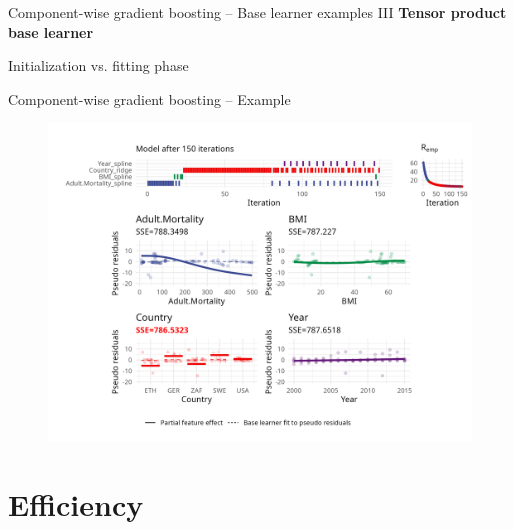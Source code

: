 \documentclass[10pt]{beamer}
\begin{document}
\begin{frame}{Component-wise gradient boosting -- Base learner examples III}
  \textbf{Tensor product base learner}
\end{frame}

\begin{frame}{Initialization vs. fitting phase}
\end{frame}

%

\begin{frame}{Component-wise gradient boosting -- Example}
	\begin{figure}
		\centering
		\includegraphics[width=\textwidth]{figures/cwb-anim/fig-iter-0150.png}
	\end{figure}
	\addtocounter{framenumber}{-1}
\end{frame}


\section{Efficiency}
\end{document}

